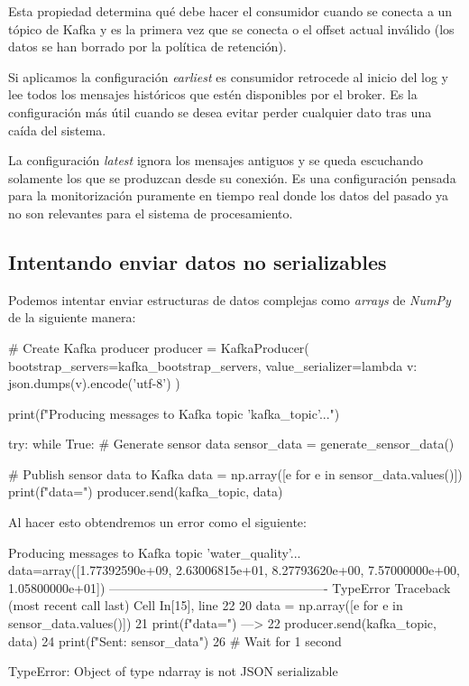 \documentclass[
	a4paper, %
	12pt, %
]{CSSullivanBusinessReport}
\begin{document}
Esta propiedad determina qué debe hacer el consumidor cuando se conecta a un tópico de Kafka y es la primera vez que se conecta o el offset actual inválido (los datos se han borrado por la política de retención). 

Si aplicamos la configuración \textit{earliest} es consumidor retrocede al inicio del log y lee todos los mensajes históricos que estén disponibles por el broker. Es la configuración más útil cuando se desea evitar perder cualquier dato tras una caída del sistema.

La configuración \textit{latest} ignora los mensajes antiguos y se queda escuchando solamente los que se produzcan desde su conexión. Es una configuración pensada para la monitorización puramente en tiempo real donde los datos del pasado ya no son relevantes para el sistema de procesamiento.


\subsection{Intentando enviar datos no serializables}

Podemos intentar enviar estructuras de datos complejas como \textit{arrays} de \textit{NumPy} de la siguiente manera:

\begin{vscodePython}
# Create Kafka producer
producer = KafkaProducer(
    bootstrap_servers=kafka_bootstrap_servers,
    value_serializer=lambda v: json.dumps(v).encode('utf-8')
)

print(f"Producing messages to Kafka topic '{kafka_topic}'...")

try:
    while True:
        # Generate sensor data
        sensor_data = generate_sensor_data()

        # Publish sensor data to Kafka
        data = np.array([e for e in sensor_data.values()])
        print(f"{data=}")
        producer.send(kafka_topic, data)

\end{vscodePython}

Al hacer esto obtendremos un error como el siguiente:
\begin{vscodeTerminal}
Producing messages to Kafka topic 'water_quality'...
data=array([1.77392590e+09, 2.63006815e+01, 8.27793620e+00, 7.57000000e+00, 1.05800000e+01])
----------------------------------------------------
TypeError                                 Traceback (most recent call last)
Cell In[15], line 22
     20 data = np.array([e for e in sensor_data.values()])
     21 print(f"{data=}")
---> 22 producer.send(kafka_topic, data)
     24 print(f"Sent: {sensor_data}")
     26 # Wait for 1 second

TypeError: Object of type ndarray is not JSON serializable
\end{vscodeTerminal}
\end{document}
